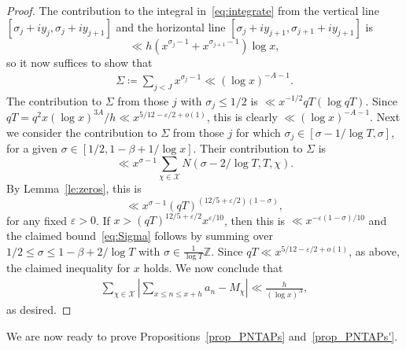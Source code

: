 \documentclass[11pt,letterpaper]{amsart}
\renewcommand{\leq}{\leqslant}
\theoremstyle{definition}
\numberwithin{equation}{section}
\newcommand{\0}{\mathbf{0}}
\begin{document}
\begin{proof}
The contribution to the integral in~\eqref{eq:integrate}
from the vertical line  $[\sigma_{j}+iy_{j},\sigma_{j}+iy_{j+1}]$ and the horizontal line $[\sigma_j+iy_{j+1},\sigma_{j+1}+iy_{j+1}]$
is
$$
\ll h(x^{\sigma_j-1}+x^{\sigma_{j+1}-1})\log x,
$$
so it now suffices to show that
\begin{align}\label{eq:Sigma}
\Sigma\coloneqq \sum_{j< J} x^{\sigma_j-1}\ll (\log x)^{-A-1}.
\end{align}
The contribution to $\Sigma$ from those $j$ with $\sigma_j\leq 1/2$ is $\ll x^{-1/2}qT(\log qT)$.
Since $qT= q^2x(\log x)^{3A}/h\ll x^{5/12-\varepsilon/2+o(1)}$, this is clearly
$\ll (\log x)^{-A-1}$. Next we  consider the contribution to $\Sigma$ from those $j$ for which $
\sigma_j\in [\sigma-1/\log T,\sigma]$, for a given $\sigma\in [1/2,1-\beta+1/\log x]$. Their contribution to $\Sigma$ is
$$
\ll x^{\sigma-1}\sum_{\chi\in \mathcal{X}}N(\sigma-2/\log T,T, \chi).
$$
By Lemma~\ref{le:zeros}, this is 
$$
\ll  x^{\sigma-1}  (qT)^{(12/5+\varepsilon/2)(1-\sigma)},
$$
for any fixed $\varepsilon>0$.
If $x>(qT)^{12/5+\varepsilon/2}x^{\varepsilon/10}$, then this is
$
\ll x^{-\varepsilon(1-\sigma)/10}
$
and the claimed bound~\eqref{eq:Sigma} follows by summing over $1/2\leq \sigma\leq 1-\beta+2/\log T$ with 
$\sigma \in \frac{1}{\log T}\mathbb{Z}$. Since $qT\ll x^{5/12-\varepsilon/2+o(1)}$, as above, the claimed inequality for $x$ holds. We now conclude that
\begin{align*}
\sum_{\chi \in \mathcal{X}}\left|\sum_{x\leq n\leq x+h}a_n-M_{\chi}\right|\ll \frac{h}{(\log x)^A},    
\end{align*}
as desired.
\end{proof}

We are now ready to prove Propositions~\ref{prop_PNTAPs} and~\ref{prop_PNTAPs'}.
\end{document}
